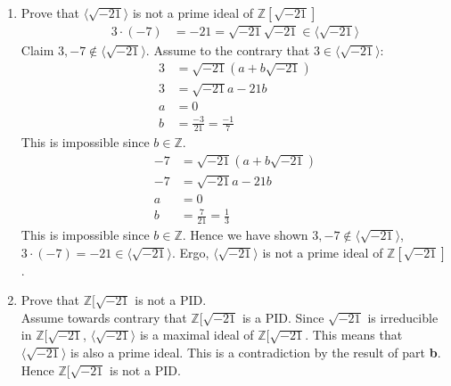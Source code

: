 \documentclass[12pt]{article}
\begin{document}
\begin{enumerate}
\begin{enumerate}
		\item Prove that $\langle\sqrt{-21}\rangle$ is not a prime ideal of
			$\mathbb{Z}[\sqrt{-21}]$\\
			\begin{align*}
				3 \cdot (-7) &= -21 = \sqrt{-21}\sqrt{-21} \in \langle\sqrt{-21}\rangle
			\end{align*}
			Claim $3, -7 \not\in \langle\sqrt{-21}\rangle$. Assume to the contrary
			that $3 \in \langle\sqrt{-21}\rangle$:
			\begin{align*}
				3 &= \sqrt{-21}(a + b\sqrt{-21})\\
				3 &= \sqrt{-21}a - 21b\\
				a &= 0\\
				b &= \frac{-3}{21} = \frac{-1}{7}
			\end{align*}
			This is impossible since $b \in \mathbb{Z}$.
			\begin{align*}
				-7 &= \sqrt{-21}(a + b\sqrt{-21})\\
				-7 &= \sqrt{-21}a - 21b\\
				a &= 0\\
				b &= \frac{7}{21} = \frac{1}{3}
			\end{align*}
			This is impossible since $b \in \mathbb{Z}$.
			Hence we have shown $3, -7 \not\in \langle\sqrt{-21}\rangle$,
			$3\cdot(-7)=-21 \in \langle\sqrt{-21}\rangle$. Ergo,
			$\langle\sqrt{-21}\rangle$ is not a prime ideal of
			$\mathbb{Z}[\sqrt{-21}]$.

		\item Prove that $\mathbb{Z}[\sqrt{-21}$ is not a PID.\\
				Assume towards contrary that $\mathbb{Z}[\sqrt{-21}$ is a PID. Since
					$\sqrt{-21}$ is irreducible in $\mathbb{Z}[\sqrt{-21}$,
						$\langle\sqrt{-21}\rangle$ is a maximal ideal of
						$\mathbb{Z}[\sqrt{-21}$. This means that $\langle\sqrt{-21}\rangle$
							is also a prime ideal. This is a contradiction by the result of
							part \textbf{b}. Hence $\mathbb{Z}[\sqrt{-21}$ is not a PID.
	\end{enumerate}


\end{enumerate}
\end{document}

